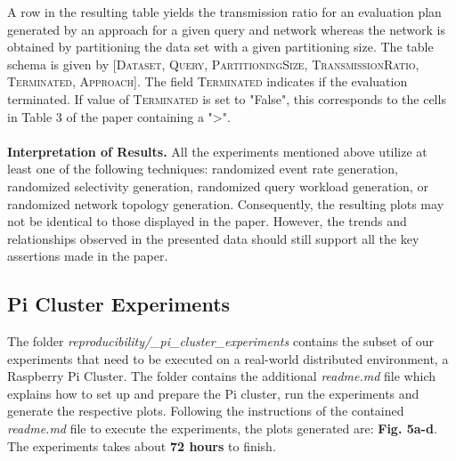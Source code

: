 \documentclass{article}
\begin{document}
A row in the resulting table yields the transmission ratio for an evaluation plan generated by an approach for a given query and network whereas the network is obtained by partitioning the data set with a given partitioning size. The table schema is given by \textsc{[Dataset, Query, PartitioningSize, TransmissionRatio, Terminated, Approach]}. The field \textsc{Terminated} indicates if the evaluation terminated. If value of \textsc{Terminated} is set to "False", this corresponds to the cells in Table 3 of the paper containing a ">".
%
%
\\
\\
\textbf{Interpretation of Results.} All the experiments mentioned above utilize at least one of the following techniques: randomized event rate generation, randomized selectivity generation, randomized query workload generation, or randomized network topology generation. Consequently, the resulting plots may not be identical to those displayed in the paper. However, the trends and relationships observed in the presented data should still support all the key assertions made in the paper.

\subsection{Pi Cluster Experiments}

The folder \textit{reproducibility/\_pi\_cluster\_experiments} contains the subset of our experiments that need to be executed on a real-world distributed environment, a Raspberry Pi Cluster. The folder contains the additional \textit{readme.md} file which explains how to set up and prepare the Pi cluster, run the experiments and generate the respective plots. Following the instructions of the contained \textit{readme.md} file to execute the experiments, the plots generated are: \textbf{Fig. 5a-d}. The experiments takes about \textbf{72 hours} to finish.
\end{document}
